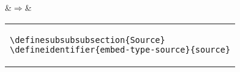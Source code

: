 \begin{examples}
  \begin{examplesource}
  \end{examplesource}
  &$\Rightarrow$&\\
  \begin{tabular}{@{}l@{}}
\begin{lstlisting}[style=codestyle,showstringspaces=false]
\definesubsubsubsection{Source}
\defineidentifier{embed-type-source}{source}
\end{lstlisting}
  \end{tabular}
\end{examples}


